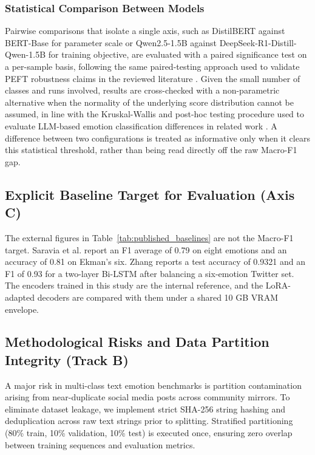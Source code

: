 \documentclass[conference]{IEEEtran}
\begin{document}
\subsubsection{Statistical Comparison Between Models}
Pairwise comparisons that isolate a single axis, such as DistilBERT against BERT-Base for parameter scale or Qwen2.5-1.5B against DeepSeek-R1-Distill-Qwen-1.5B for training objective, are evaluated with a paired significance test on a per-sample basis, following the same paired-testing approach used to validate PEFT robustness claims in the reviewed literature \cite{wu2025advlora}. Given the small number of classes and runs involved, results are cross-checked with a non-parametric alternative when the normality of the underlying score distribution cannot be assumed, in line with the Kruskal-Wallis and post-hoc testing procedure used to evaluate LLM-based emotion classification differences in related work \cite{yang2023context}. A difference between two configurations is treated as informative only when it clears this statistical threshold, rather than being read directly off the raw Macro-F1 gap.

\subsection{Explicit Baseline Target for Evaluation (Axis C)}
The external figures in Table~\ref{tab:published_baselines} are not the Macro-F1 target. Saravia et al. \cite{saravia2018carer} report an F1 average of 0.79 on eight emotions and an accuracy of 0.81 on Ekman's six. Zhang \cite{zhang2024comparative} reports a test accuracy of 0.9321 and an F1 of 0.93 for a two-layer Bi-LSTM after balancing a six-emotion Twitter set. The encoders trained in this study are the internal reference, and the LoRA-adapted decoders are compared with them under a shared 10 GB VRAM envelope.

\subsection{Methodological Risks and Data Partition Integrity (Track B)}
A major risk in multi-class text emotion benchmarks is partition contamination arising from near-duplicate social media posts across community mirrors. To eliminate dataset leakage, we implement strict SHA-256 string hashing and deduplication across raw text strings prior to splitting. Stratified partitioning (80\% train, 10\% validation, 10\% test) is executed once, ensuring zero overlap between training sequences and evaluation metrics.
\end{document}
